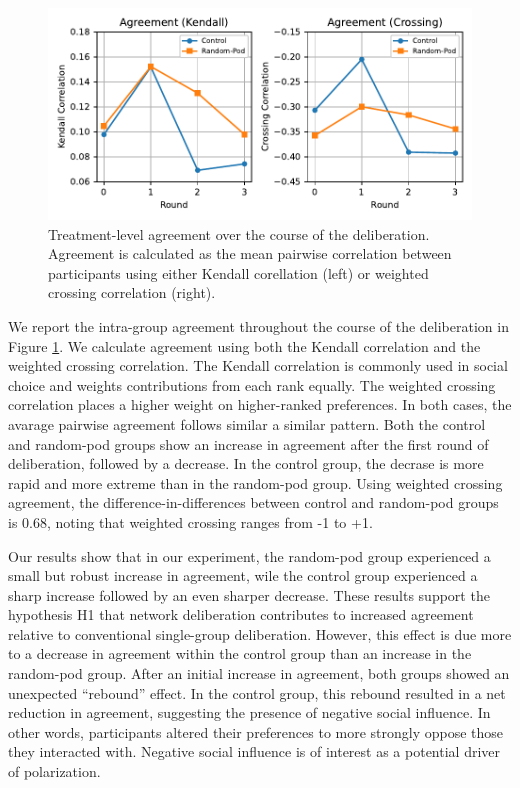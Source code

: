 {\begin{figure}
    \centering
    \includegraphics[width=6in]{chapters/figures/NetDelibExp/fig-agreement-fillattr.pdf}
    \caption{Treatment-level agreement over the course of the deliberation. Agreement is calculated as the mean pairwise correlation between participants using either Kendall corellation (left) or weighted crossing correlation (right).}
    \label{fig:agreement}
\end{figure}

We report the intra-group agreement throughout the course of the deliberation in Figure \ref{fig:agreement}.
We calculate agreement using both the Kendall correlation
and the weighted crossing correlation.
The Kendall correlation is commonly used in social choice and weights contributions from each rank equally.
The weighted crossing correlation places a higher weight on
higher-ranked preferences.
In both cases, the avarage pairwise agreement follows similar a similar pattern.
Both the control and random-pod groups show an increase in agreement after the first round of deliberation,
followed by a decrease.
In the control group, the decrase is more rapid and more extreme than in the random-pod group.
Using weighted crossing agreement, the difference-in-differences between control and random-pod groups is 0.68, noting that weighted crossing ranges from -1 to +1.

Our results show that in our experiment, the random-pod group 
experienced a small but robust increase in agreement,
wile the control group experienced a sharp increase followed by an even sharper decrease.
These results support the hypothesis H1 that network deliberation contributes to increased agreement relative to conventional single-group deliberation.
However, this effect is due more to a decrease in agreement
within the control group than an increase in the random-pod group.
After an initial increase in agreement, both groups showed an unexpected ``rebound'' effect.
In the control group, this rebound resulted in a net reduction in agreement, suggesting the presence of negative social influence.
In other words, participants altered their preferences to more strongly oppose those they interacted with.
Negative social influence is of interest as a potential driver of polarization.

}
